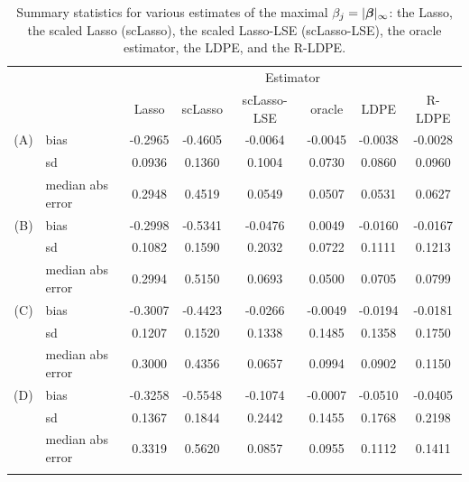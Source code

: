 \documentclass[11pt]{amsart}
\begin{document}
\begin{table}[ht]
\begin{tabular}{rlcccccc}
\toprule
&&\multicolumn{6}{c}{Estimator}\\
\cmidrule{3-8}
&& Lasso & scLasso & {scLasso-LSE}& oracle & LDPE & R-LDPE\\ 
\midrule
\addlinespace
(A) & bias & -0.2965 & -0.4605 & -0.0064 & -0.0045 & -0.0038 & -0.0028\\
 & sd& 0.0936 & 0.1360 & 0.1004 & 0.0730 & 0.0860 & 0.0960\\
 & median abs error& 0.2948 & 0.4519 & 0.0549 & 0.0507 & 0.0531 & 0.0627\\
\addlinespace
(B) & bias & -0.2998 & -0.5341 & -0.0476 & 0.0049 & -0.0160 & -0.0167\\
 &sd & 0.1082 & 0.1590 & 0.2032 & 0.0722 & 0.1111 & 0.1213\\
 & median abs error & 0.2994 & 0.5150 & 0.0693 & 0.0500 & 0.0705 & 0.0799\\
\addlinespace
(C) &bias & -0.3007 & -0.4423 & -0.0266 & -0.0049 & -0.0194 & -0.0181\\
 & sd & 0.1207 & 0.1520 & 0.1338 & 0.1485 & 0.1358 & 0.1750\\
 & median abs error & 0.3000 & 0.4356 & 0.0657 & 0.0994 & 0.0902 & 0.1150\\
\addlinespace
(D)& bias& -0.3258 & -0.5548 & -0.1074 & -0.0007 & -0.0510 & -0.0405\\
&sd& 0.1367 & 0.1844 & 0.2442 & 0.1455 & 0.1768 & 0.2198\\
 &median abs error& 0.3319 & 0.5620 & 0.0857 & 0.0955 & 0.1112 & 0.1411\\
\bottomrule
\addlinespace
  \end{tabular}
\caption{Summary statistics for various estimates of the maximal $\beta_j = {|}\boldsymbol{\beta}{|}_\infty$: the Lasso, the scaled Lasso (scLasso), {the scaled Lasso-LSE} (scLasso-LSE), the oracle estimator, the LDPE, and the {R-LDPE}.}
\label{table:maxerror}
\end{table}
\end{document}

